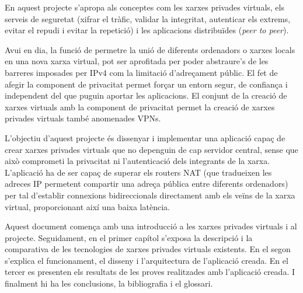 \portada

\begin{resum}{7.8cm}
En aquest projecte s'apropa als conceptes com les xarxes privades virtuals, els serveis de seguretat (xifrar el tràfic, validar la integritat, autenticar els extrems, evitar el repudi i evitar la repetició) i les aplicacions distribuïdes (\emph{peer to peer}).

Avui en dia, la funció de permetre la unió de diferents ordenadors o xarxes locals en una nova xarxa virtual, pot ser aprofitada per poder abstraure's de les barreres imposades per IPv4 com la limitació d'adreçament públic. El fet de afegir la component de privacitat permet forçar un entorn segur, de confiança i independent del que puguin aportar les aplicacions. El conjunt de la creació de xarxes virtuals amb la component de privacitat permet la creació de xarxes privades virtuals també anomenades VPNs.

L'objectiu d'aquest projecte és dissenyar i implementar una aplicació capaç de crear xarxes privades virtuals que no depenguin de cap servidor central, sense que això comprometi la privacitat ni l'autenticació dels integrants de la xarxa. L'aplicació ha de ser capaç de superar els routers NAT (que tradueixen les adreces IP permetent compartir una adreça pública entre diferents ordenadors) per tal d'establir connexions bidireccionals directament amb els veïns de la xarxa virtual, proporcionant així una baixa latència.

Aquest document comença amb una introducció a les xarxes privades virtuals i al projecte.
Seguidament, en el primer capítol s'exposa la descripció i la comparativa de les tecnologies de xarxes privades virtuals existents.
En el segon s'explica el funcionament, el disseny i l'arquitectura de l'aplicació creada.
En el tercer es presenten els resultats de les proves realitzades amb l'aplicació creada.
I finalment hi ha les conclusions, la bibliografia i el glossari.
\end{resum}

